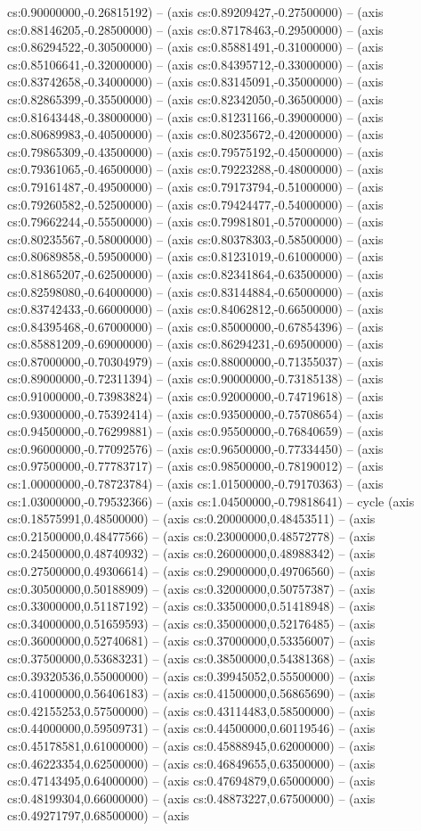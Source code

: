 cs:0.90000000,-0.26815192) -- (axis cs:0.89209427,-0.27500000) -- (axis cs:0.88146205,-0.28500000) -- (axis cs:0.87178463,-0.29500000) -- (axis cs:0.86294522,-0.30500000) -- (axis cs:0.85881491,-0.31000000) -- (axis cs:0.85106641,-0.32000000) -- (axis cs:0.84395712,-0.33000000) -- (axis cs:0.83742658,-0.34000000) -- (axis cs:0.83145091,-0.35000000) -- (axis cs:0.82865399,-0.35500000) -- (axis cs:0.82342050,-0.36500000) -- (axis cs:0.81643448,-0.38000000) -- (axis cs:0.81231166,-0.39000000) -- (axis cs:0.80689983,-0.40500000) -- (axis cs:0.80235672,-0.42000000) -- (axis cs:0.79865309,-0.43500000) -- (axis cs:0.79575192,-0.45000000) -- (axis cs:0.79361065,-0.46500000) -- (axis cs:0.79223288,-0.48000000) -- (axis cs:0.79161487,-0.49500000) -- (axis cs:0.79173794,-0.51000000) -- (axis cs:0.79260582,-0.52500000) -- (axis cs:0.79424477,-0.54000000) -- (axis cs:0.79662244,-0.55500000) -- (axis cs:0.79981801,-0.57000000) -- (axis cs:0.80235567,-0.58000000) -- (axis cs:0.80378303,-0.58500000) -- (axis cs:0.80689858,-0.59500000) -- (axis cs:0.81231019,-0.61000000) -- (axis cs:0.81865207,-0.62500000) -- (axis cs:0.82341864,-0.63500000) -- (axis cs:0.82598080,-0.64000000) -- (axis cs:0.83144884,-0.65000000) -- (axis cs:0.83742433,-0.66000000) -- (axis cs:0.84062812,-0.66500000) -- (axis cs:0.84395468,-0.67000000) -- (axis cs:0.85000000,-0.67854396) -- (axis cs:0.85881209,-0.69000000) -- (axis cs:0.86294231,-0.69500000) -- (axis cs:0.87000000,-0.70304979) -- (axis cs:0.88000000,-0.71355037) -- (axis cs:0.89000000,-0.72311394) -- (axis cs:0.90000000,-0.73185138) -- (axis cs:0.91000000,-0.73983824) -- (axis cs:0.92000000,-0.74719618) -- (axis cs:0.93000000,-0.75392414) -- (axis cs:0.93500000,-0.75708654) -- (axis cs:0.94500000,-0.76299881) -- (axis cs:0.95500000,-0.76840659) -- (axis cs:0.96000000,-0.77092576) -- (axis cs:0.96500000,-0.77334450) -- (axis cs:0.97500000,-0.77783717) -- (axis cs:0.98500000,-0.78190012) -- (axis cs:1.00000000,-0.78723784) -- (axis cs:1.01500000,-0.79170363) -- (axis cs:1.03000000,-0.79532366) -- (axis cs:1.04500000,-0.79818641) -- cycle (axis cs:0.18575991,0.48500000) -- (axis cs:0.20000000,0.48453511) -- (axis cs:0.21500000,0.48477566) -- (axis cs:0.23000000,0.48572778) -- (axis cs:0.24500000,0.48740932) -- (axis cs:0.26000000,0.48988342) -- (axis cs:0.27500000,0.49306614) -- (axis cs:0.29000000,0.49706560) -- (axis cs:0.30500000,0.50188909) -- (axis cs:0.32000000,0.50757387) -- (axis cs:0.33000000,0.51187192) -- (axis cs:0.33500000,0.51418948) -- (axis cs:0.34000000,0.51659593) -- (axis cs:0.35000000,0.52176485) -- (axis cs:0.36000000,0.52740681) -- (axis cs:0.37000000,0.53356007) -- (axis cs:0.37500000,0.53683231) -- (axis cs:0.38500000,0.54381368) -- (axis cs:0.39320536,0.55000000) -- (axis cs:0.39945052,0.55500000) -- (axis cs:0.41000000,0.56406183) -- (axis cs:0.41500000,0.56865690) -- (axis cs:0.42155253,0.57500000) -- (axis cs:0.43114483,0.58500000) -- (axis cs:0.44000000,0.59509731) -- (axis cs:0.44500000,0.60119546) -- (axis cs:0.45178581,0.61000000) -- (axis cs:0.45888945,0.62000000) -- (axis cs:0.46223354,0.62500000) -- (axis cs:0.46849655,0.63500000) -- (axis cs:0.47143495,0.64000000) -- (axis cs:0.47694879,0.65000000) -- (axis cs:0.48199304,0.66000000) -- (axis cs:0.48873227,0.67500000) -- (axis cs:0.49271797,0.68500000) -- (axis 